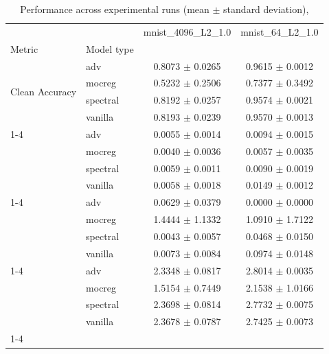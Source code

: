 \begin{table}
\caption{Performance across experimental runs (mean $\pm$ standard deviation), }
\label{tab:experiment_results}
\begin{tabular}{ll|cc}
\toprule
 &  & mnist_4096_L2_1.0 & mnist_64_L2_1.0 \\
Metric & Model type &  &  \\
\midrule
\multirow[t]{4}{*}{Clean Accuracy} & adv & 0.8073 $\pm$ 0.0265 & 0.9615 $\pm$ 0.0012 \\
 & mocreg & 0.5232 $\pm$ 0.2506 & 0.7377 $\pm$ 0.3492 \\
 & spectral & 0.8192 $\pm$ 0.0257 & 0.9574 $\pm$ 0.0021 \\
 & vanilla & 0.8193 $\pm$ 0.0239 & 0.9570 $\pm$ 0.0013 \\
\cline{1-4}
\multirow[t]{4}{*}{Generalization Gap} & adv & 0.0055 $\pm$ 0.0014 & 0.0094 $\pm$ 0.0015 \\
 & mocreg & 0.0040 $\pm$ 0.0036 & 0.0057 $\pm$ 0.0035 \\
 & spectral & 0.0059 $\pm$ 0.0011 & 0.0090 $\pm$ 0.0019 \\
 & vanilla & 0.0058 $\pm$ 0.0018 & 0.0149 $\pm$ 0.0012 \\
\cline{1-4}
\multirow[t]{4}{*}{Cumulative Robustness} & adv & 0.0629 $\pm$ 0.0379 & 0.0000 $\pm$ 0.0000 \\
 & mocreg & 1.4444 $\pm$ 1.1332 & 1.0910 $\pm$ 1.7122 \\
 & spectral & 0.0043 $\pm$ 0.0057 & 0.0468 $\pm$ 0.0150 \\
 & vanilla & 0.0073 $\pm$ 0.0084 & 0.0974 $\pm$ 0.0148 \\
\cline{1-4}
\multirow[t]{4}{*}{AUC} & adv & 2.3348 $\pm$ 0.0817 & 2.8014 $\pm$ 0.0035 \\
 & mocreg & 1.5154 $\pm$ 0.7449 & 2.1538 $\pm$ 1.0166 \\
 & spectral & 2.3698 $\pm$ 0.0814 & 2.7732 $\pm$ 0.0075 \\
 & vanilla & 2.3678 $\pm$ 0.0787 & 2.7425 $\pm$ 0.0073 \\
\cline{1-4}
\bottomrule
\end{tabular}
\end{table}
